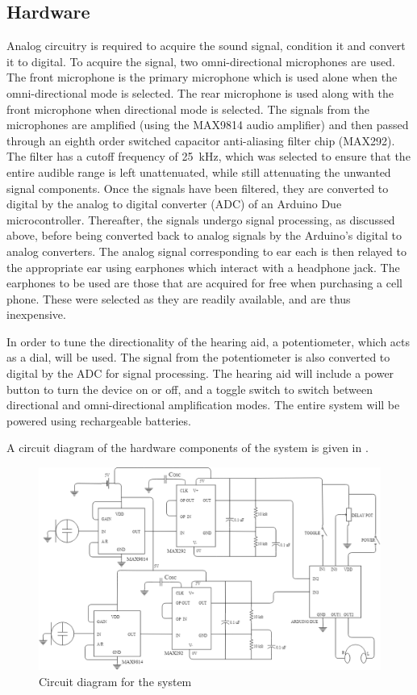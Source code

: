 \documentclass[10pt,twocolumn]{witseiepaper}
\begin{document}
\subsection{Hardware} \label{sec:hardware}
Analog circuitry is required to acquire the sound signal, condition it and convert it to digital. To acquire the signal, two omni-directional microphones are used. The front microphone is the primary microphone which is used alone when the omni-directional mode is selected. The rear microphone is used along with the front microphone when directional mode is selected. The signals from the microphones are amplified (using the MAX9814 audio amplifier) and then passed through an eighth order switched capacitor anti-aliasing filter chip (MAX292). The filter has a cutoff frequency of 25~kHz, which was selected to ensure that the entire audible range is left unattenuated, while still attenuating the unwanted signal components. Once the signals have been filtered, they are converted to digital by the analog to digital converter (ADC) of an Arduino Due microcontroller. Thereafter, the signals undergo signal processing, as discussed above, before being converted back to analog signals by the Arduino's digital to analog converters. The analog signal corresponding to ear each is then relayed to the appropriate ear using earphones which interact with a headphone jack. The earphones to be used are those that are acquired for free when purchasing a cell phone. These were selected as they are readily available, and are thus inexpensive.

In order to tune the directionality of the hearing aid, a potentiometer, which acts as a dial, will be used. The signal from the potentiometer is also converted to digital by the ADC for signal processing. The hearing aid will include a power button to turn the device on or off, and a toggle switch to switch between directional and omni-directional amplification modes. The entire system will be powered using rechargeable batteries. 

A circuit diagram of the hardware components of the system is given in .

	\begin{figure}[t]
	\centering
	\includegraphics[width=1\textwidth]{fullCircuitDiagram.png}
	\caption{Circuit diagram for the system}
	\raggedright
	\label{fig:circuit}	
\end{figure}
\end{document}
